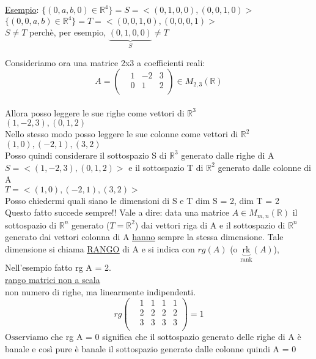 \textsf{\small \underline{Esempio}:} $\{ (0,a,b,0) \in \mathbb{R}^4 \} = S = <(0,1,0,0),(0,0,1,0)>$\\
\textsf{\small $\{ (0,0,a,b) \in \mathbb{R}^4\} = T = <(0,0,1,0),(0,0,0,1)>$}\\
$ S \neq T$ \textsf{\small perchè, per esempio, $\underbrace{(0,1,0,0)} _{S} \neq T$}\break

\textsf{\small Consideriamo ora una matrice 2x3 a coefficienti reali:}\\
\[
A =
\begin{pmatrix}
	&1 &-2 &3 \\
	&0 &1 &2 \\
\end{pmatrix}
\in M_{2,3}(\mathbb{R})
\]\\
\centering\textsf{\small Allora posso leggere le sue righe come vettori di $\mathbb{R}^3$}\\
\(
(1,-2,3),(0,1,2)
\)\\
\centering\textsf{\small Nello stesso modo posso leggere le sue colonne come vettori di $\mathbb{R}^2$}\\
\(
(1,0),(-2,1),(3,2)
\)\\
\textsf{\small Posso quindi considerare il sottospazio S di $\mathbb{R}^3$ generato dalle righe di A}\\
$S = <(1,-2,3),(0,1,2)>$ \textsf{\small e il sottospazio T di $\mathbb{R}^2$ generato dalle colonne di A}\\
$T = <(1,0),(-2,1),(3,2)>$\\
\textsf{\small Posso chiedermi quali siano le dimensioni di S e T dim S = 2, dim T = 2}\\
\textsf{\small Questo fatto succede sempre!! Vale a dire: data una matrice $A \in M_{m,n}(\mathbb{R})$ il sottospazio di $\mathbb{R}^n$ generato ($T = \mathbb{R}^2$) dai vettori riga di A e il sottospazio di $\mathbb{R}^n$ generato dai vettori colonna di A \underline{\underline{hanno}} sempre la stessa dimensione. Tale dimensione si chiama \underline{\underline{RANGO}} di A e si indica con $rg(A)$ (o $\underbrace{\text{rk}} _{\text{rank}}(A)$), Nell'esempio fatto rg A = 2.}\\
\textsf{\small \underline{rango matrici non a scala}}\\
\textsf{\small non numero di righe, ma linearmente indipendenti.}\\
\[
rg
\begin{pmatrix}
	&1 &1 &1 &1 \\
	&2 &2 &2 &2 \\
	&3 &3 &3 &3 \\
\end{pmatrix}
= 1
\]
\flushleft$\boxed{\text{Osserviamo}}$ \textsf{\small che rg A = 0 significa che il sottospazio generato delle righe di A è banale e così pure è banale il sottospazio generato dalle colonne quindi A = 0}\\

